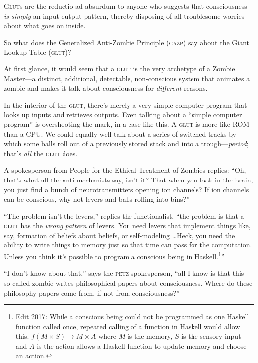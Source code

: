 {
 \textsc{Glut}s are the reductio ad absurdum to anyone who suggests that
consciousness \textit{is simply} an input-output pattern, thereby
disposing of all troublesome worries about what goes on inside.}

{
 So what does the Generalized Anti-Zombie Principle (\textsc{gazp}) say
about the Giant Lookup Table (\textsc{glut})?}

{
 At first glance, it would seem that a \textsc{glut} is the very archetype
of a Zombie Master---a distinct, additional, detectable, non-conscious
system that animates a zombie and makes it talk about consciousness for
\textit{different} reasons.}

{
 In the interior of the \textsc{glut}, there's merely a very
simple computer program that looks up inputs and retrieves outputs.
Even talking about a ``simple computer
program'' is overshooting the mark, in a case like
this. A \textsc{glut} is more like ROM than a CPU. We could equally well talk
about a series of switched tracks by which some balls roll out of a
previously stored stack and into a trough---\textit{period};
that's \textit{all} the \textsc{glut} does.}

{
 A spokesperson from People for the Ethical Treatment of Zombies
replies: ``Oh, that's what all the
anti-mechanists say, isn't it? That when you look in
the brain, you just find a bunch of neurotransmitters opening ion
channels? If ion channels can be conscious, why not levers and balls
rolling into bins?''}

{
 ``The problem isn't the
levers,'' replies the functionalist,
``the problem is that a \textsc{glut} has the \textit{wrong
pattern} of levers. You need levers that implement things like, say,
formation of beliefs about beliefs, or self-modeling \ldots Heck, you
need the ability to write things to memory just so that time can pass
for the computation. Unless you think it's possible to
program a conscious being in Haskell.\footnote{Edit 2017: While a conscious being could not be programmed as one Haskell function called once, repeated calling of a function in Haskell would allow this.  $f(M \times S) \to M \times A$ where $M$ is the memory, $S$ is the sensory input and $A$ is the action allows a Haskell function to update memory and choose an action.}''}

{
 ``I don't know about
that,'' says the \textsc{petz} spokesperson,
``all I know is that this so-called zombie writes
philosophical papers about consciousness. Where do these philosophy
papers come from, if not from consciousness?''}

